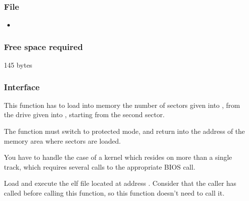 \subsubsection*{File}
\begin{itemize}
  \item {}
\end{itemize}

\subsubsection*{Free space required}
145 bytes

\subsubsection*{Interface}

{
  This function has to load into memory the number of sectors given into
  , from the drive given into , starting from
  the second sector.

  The function must switch to protected mode, and return into 
  the address of the memory area where sectors are loaded.

  You have to handle the case of a kernel which resides on more than a single
  track, which requires several calls to the appropriate BIOS call.
}

{
  Load and execute the elf file located at address .
  Consider that the caller has called  before calling
  this function, so this function doesn't need to call it.
}
